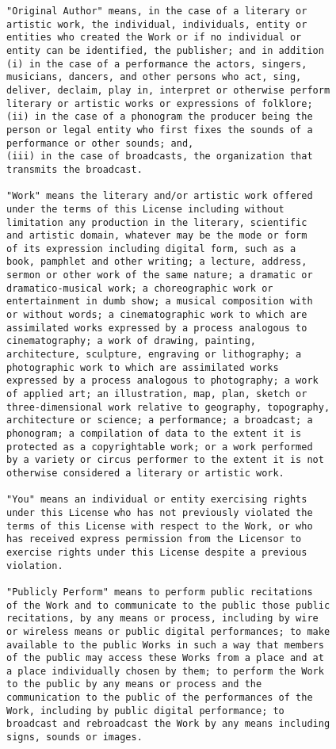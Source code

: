 \begin{verbatim}
"Original Author" means, in the case of a literary or
artistic work, the individual, individuals, entity or
entities who created the Work or if no individual or
entity can be identified, the publisher; and in addition
(i) in the case of a performance the actors, singers,
musicians, dancers, and other persons who act, sing,
deliver, declaim, play in, interpret or otherwise perform
literary or artistic works or expressions of folklore;
(ii) in the case of a phonogram the producer being the
person or legal entity who first fixes the sounds of a
performance or other sounds; and,
(iii) in the case of broadcasts, the organization that
transmits the broadcast.

"Work" means the literary and/or artistic work offered
under the terms of this License including without
limitation any production in the literary, scientific
and artistic domain, whatever may be the mode or form
of its expression including digital form, such as a
book, pamphlet and other writing; a lecture, address,
sermon or other work of the same nature; a dramatic or
dramatico-musical work; a choreographic work or
entertainment in dumb show; a musical composition with
or without words; a cinematographic work to which are
assimilated works expressed by a process analogous to
cinematography; a work of drawing, painting,
architecture, sculpture, engraving or lithography; a
photographic work to which are assimilated works
expressed by a process analogous to photography; a work
of applied art; an illustration, map, plan, sketch or
three-dimensional work relative to geography, topography,
architecture or science; a performance; a broadcast; a
phonogram; a compilation of data to the extent it is
protected as a copyrightable work; or a work performed
by a variety or circus performer to the extent it is not
otherwise considered a literary or artistic work.

"You" means an individual or entity exercising rights
under this License who has not previously violated the
terms of this License with respect to the Work, or who
has received express permission from the Licensor to
exercise rights under this License despite a previous
violation.

"Publicly Perform" means to perform public recitations
of the Work and to communicate to the public those public
recitations, by any means or process, including by wire
or wireless means or public digital performances; to make
available to the public Works in such a way that members
of the public may access these Works from a place and at
a place individually chosen by them; to perform the Work
to the public by any means or process and the
communication to the public of the performances of the
Work, including by public digital performance; to
broadcast and rebroadcast the Work by any means including
signs, sounds or images.


\end{verbatim}
